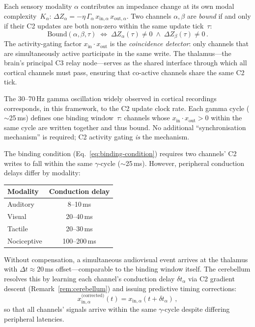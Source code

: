 \documentclass[aps,pre,twocolumn,superscriptaddress,floatfix]{revtex4-2}
\begin{document}
Each sensory modality $\alpha$ contributes an impedance
change at its own modal complexity~$K_\alpha$:
$\Delta Z_\alpha = -\eta\,\Gamma_\alpha\,
x_{\text{in},\alpha}\,x_{\text{out},\alpha}$.
Two channels $\alpha,\beta$ are \emph{bound} if and only
if their C2 updates are both non-zero within the same
update tick~$\tau$:
\begin{equation}
  \text{Bound}(\alpha,\beta,\tau)
  \;\Longleftrightarrow\;
  \Delta Z_\alpha(\tau) \neq 0
  \;\wedge\;
  \Delta Z_\beta(\tau) \neq 0\,.
  \label{eq:binding-condition}
\end{equation}
The activity-gating factor
$x_{\text{in}} \cdot x_{\text{out}}$ is the
\emph{coincidence detector}: only channels that are
simultaneously active participate in the same write.
The thalamus---the brain's principal C3 relay node---serves
as the shared interface through which all cortical
channels must pass, ensuring that co-active channels
share the same C2 tick.

\begin{remark}
\label{rem:gamma-clock}
The 30--70\,Hz gamma oscillation widely observed in
cortical recordings corresponds, in this framework,
to the C2 update clock rate.
Each gamma cycle ($\sim$25\,ms) defines one binding
window~$\tau$: channels whose $x_{\text{in}} \cdot
x_{\text{out}} > 0$ within the same cycle are written
together and thus bound.
No additional ``synchronisation mechanism'' is required;
C2 activity gating \emph{is} the mechanism.
\end{remark}

\begin{corollary}
\label{cor:cerebellum-binding}
The binding condition
(Eq.~\ref{eq:binding-condition}) requires two
channels' C2 writes to fall within the same
$\gamma$-cycle ($\sim$25\,ms).
However, peripheral conduction delays differ
by modality:
\begin{center}
\begin{tabular}{lc}
\toprule
Modality & Conduction delay \\
\midrule
Auditory  & 8--10\,ms \\
Visual    & 20--40\,ms \\
Tactile   & 20--30\,ms \\
Nociceptive & 100--200\,ms \\
\bottomrule
\end{tabular}
\end{center}
Without compensation, a simultaneous audiovisual
event arrives at the thalamus with
$\Delta t \approx 20$\,ms offset---comparable to
the binding window itself.
The cerebellum resolves this by learning each
channel's conduction delay $\delta t_\alpha$
via C2 gradient descent (Remark~\ref{rem:cerebellum})
and issuing predictive timing corrections:
\begin{equation}
  x_{\text{in},\alpha}^{\text{(corrected)}}(t)
  = x_{\text{in},\alpha}(t + \delta t_\alpha)\,,
  \label{eq:cerebellar-timing}
\end{equation}
so that all channels' signals arrive within the
same $\gamma$-cycle despite differing peripheral
latencies.
\end{corollary}
\end{document}
